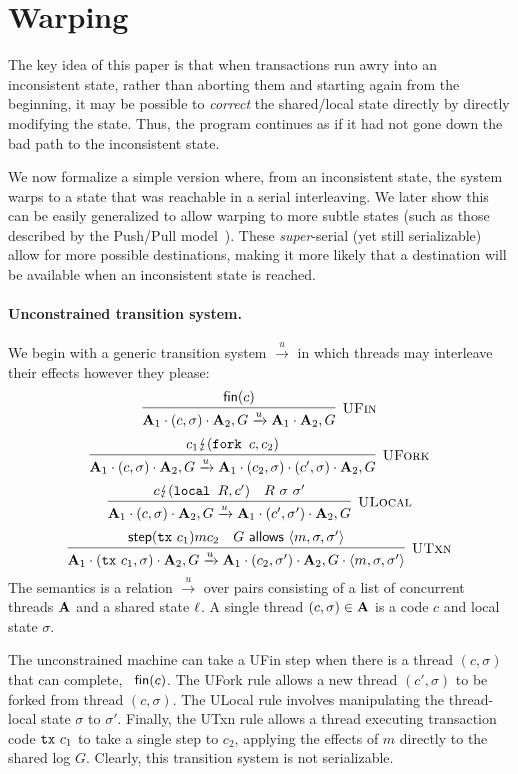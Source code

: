 \section{Warping}

The key idea of this paper is that when transactions run
awry into an inconsistent state, rather than aborting them and
starting again from the beginning, it may be possible to
\emph{correct} the shared/local state directly by directly
modifying the state. Thus, the program continues as if it had not
gone down the bad path to the inconsistent state.

We now formalize a simple version where, from an inconsistent state,
the system warps to a state that was reachable in a serial
interleaving. We later show this can be easily generalized to allow
warping to more subtle states (such as those described by the
Push/Pull model~\cite{}). These \emph{super}-serial (yet still
serializable) allow for more possible destinations, making it more
likely that a destination will be available when an inconsistent state
is reached.


\paragraph{Unconstrained transition system.}

We begin with a generic transition system $\xrightarrow{u}$ in which threads may
interleave their effects however they please:
$$
\infer[\text{\sc UFin}]{ 
  \As_1 \cdot (c,\sigma) \cdot \As_2, G  \xrightarrow{u}
  \As_1 \cdot \As_2, G 
}{
  \nothing{c}
}
$$
$$
\infer[\text{\sc UFork}]{ 
  \As_1 \cdot (c,\sigma) \cdot \As_2, G  \xrightarrow{u}
  \As_1 \cdot (c_2,\sigma) \cdot (c',\sigma) \cdot \As_2, G 
}{
  \tstep{c_1}{\fork{c}}{c_2}
}
$$
$$
\infer[\text{\sc ULocal}]{ 
  \As_1 \cdot (c,\sigma) \cdot \As_2, G  \xrightarrow{u}
  \As_1 \cdot (c',\sigma') \cdot \As_2, G 
}{
  \tstep{c}{\local{R}}{c'} & R\ \sigma\ \sigma'
}
$$
$$
\infer[\text{\sc UTxn}]{ 
  \As_1 \cdot (\tx{c_1},\sigma) \cdot \As_2, G  \xrightarrow{u}
  \As_1 \cdot (c_2,\sigma') \cdot \As_2, G\cdot \langle m,\sigma,\sigma' \rangle
}{
  \step{\tx{c_1}}{m}{c_2} &
  G \allows \langle m,\sigma,\sigma' \rangle
}
$$
The semantics is a relation
$\xrightarrow{u}$ over pairs consisting of a list of concurrent
threads $\mathbf{A}$ and a shared state $\ell$. 
A single thread $(c,\sigma)\in\mathbf{A}$ is a code $c$ and local state $\sigma$. 

The unconstrained machine can take a {\sc UFin} step when there is a thread
$(c,\sigma)$ that can complete, \ie~$\textsf{fin}(c)$.
%
The {\sc UFork} rule allows a new thread
$(c',\sigma)$ to be forked from thread $(c,\sigma)$.
%
The {\sc ULocal} rule involves manipulating the thread-local state
$\sigma$ to $\sigma'$.
%
Finally, the {\sc UTxn} rule allows a thread executing transaction
code $\texttt{tx}\ c_1$ to take a single step to $c_2$, applying the effects
of $m$ directly to the shared log $G$.
Clearly, this transition
system is not serializable. 

